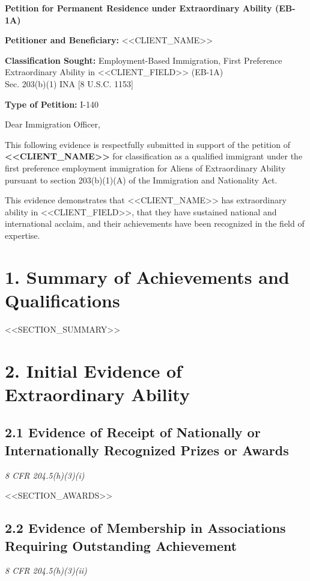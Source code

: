 \documentclass[12pt,letterpaper]{article}
\newcommand{\clientname}{<<CLIENT_NAME>>}
\newcommand{\clientfield}{<<CLIENT_FIELD>>}
\begin{document}
\begin{center}
\Large\textbf{Petition for Permanent Residence under Extraordinary Ability (EB-1A)}
\end{center}

\vspace{1em}

\noindent\textbf{Petitioner and Beneficiary:} \clientname

\noindent\textbf{Classification Sought:} Employment-Based Immigration, First Preference\\
Extraordinary Ability in \clientfield{} (EB-1A)\\
Sec. 203(b)(1) INA [8 U.S.C. 1153]

\noindent\textbf{Type of Petition:} I-140

\vspace{1.5em}

\noindent Dear Immigration Officer,

This following evidence is respectfully submitted in support of the petition of \textbf{\clientname} for classification as a qualified immigrant under the first preference employment immigration for Aliens of Extraordinary Ability pursuant to section 203(b)(1)(A) of the Immigration and Nationality Act.

This evidence demonstrates that \clientname{} has extraordinary ability in \clientfield{}, that they have sustained national and international acclaim, and their achievements have been recognized in the field of expertise.

\section*{1. Summary of Achievements and Qualifications}

<<SECTION_SUMMARY>>

\section*{2. Initial Evidence of Extraordinary Ability}

\subsection*{2.1 Evidence of Receipt of Nationally or Internationally Recognized Prizes or Awards}
\textit{8 CFR 204.5(h)(3)(i)}

<<SECTION_AWARDS>>

\subsection*{2.2 Evidence of Membership in Associations Requiring Outstanding Achievement}
\textit{8 CFR 204.5(h)(3)(ii)}
\end{document}
